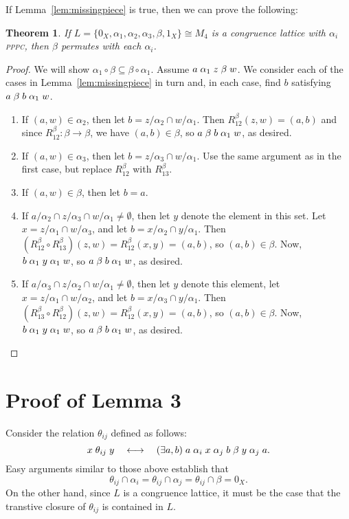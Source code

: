 \documentclass{amsart}
\theoremstyle{plain}
\newtheorem{theorem}{Theorem}
\theoremstyle{definition}
\theoremstyle{definition}
\numberwithin{equation}{section}
\newcommand{\<}{\ensuremath{\langle}}
\renewcommand{\>}{\ensuremath{\rangle}}
\newcommand{\rel}{\ensuremath{\mathrel}}
\newcommand{\PPPC}{\textsc{pppc}\xspace}
\begin{document}
If Lemma~\ref{lem:missingpiece} is true, then we can prove the following:
\begin{theorem}
If $L = \{0_X, \alpha_1, \alpha_2, \alpha_3, \beta, 1_X\} \cong  M_4$ is a
congruence lattice with $\alpha_i$ \PPPC, then $\beta$ permutes with each $\alpha_i$.
\end{theorem}
\begin{proof}
We will show $\alpha_1 \circ \beta \subseteq \beta \circ \alpha_1$.
Assume $a \rel{\alpha_1} z \rel{\beta} w$.  We consider each of the cases in
Lemma~\ref{lem:missingpiece} in turn and,
in each case, find $b$ satisfying $a \rel{\beta} b \rel{\alpha_1} w$.
\begin{enumerate}
\item If $(a,w) \in \alpha_2$, then let $b = z/\alpha_2 \cap w/\alpha_1$.  Then
$R^\beta_{12}(z,w) = (a,b)$ and since 
$R^\beta_{12}: \beta \rightarrow \beta$, we have $(a,b) \in \beta$, so 
$a \rel{\beta} b \rel{\alpha_1} w$, as desired.  
\item If $(a,w) \in \alpha_3$, then let $b = z/\alpha_3 \cap w/\alpha_1$. Use the same
argument as in the first case, but replace $R^\beta_{12}$ with $R^\beta_{13}$. 
\item If $(a,w) \in \beta$, then let $b = a$. 
\item If  $a/\alpha_2 \cap z/\alpha_3 \cap w/\alpha_1 \neq \emptyset$, then let
  $y$ denote the element in this set.  Let $x = z/\alpha_1 \cap w/\alpha_3$, and
  let $b = x/\alpha_2\cap y/\alpha_1$.  
  Then $(R^\beta_{12}\circ R^\beta_{13})(z,w) = R^\beta_{12}(x,y) = (a,b)$, so $(a,b) \in \beta$.
  Now, $b\rel{\alpha_1} y \rel{\alpha_1} w$, so
  $a \rel{\beta} b \rel{\alpha_1} w$, as desired.
\item If $a/\alpha_3 \cap z/\alpha_2 \cap w/\alpha_1 \neq \emptyset$, then let 
  $y$ denote this element, let $x = z/\alpha_1 \cap w/\alpha_2$, and
  let $b = x/\alpha_3\cap y/\alpha_1$.  
  Then $(R^\beta_{13}\circ R^\beta_{12})(z,w) = R^\beta_{12}(x,y) = (a,b)$, so $(a,b) \in \beta$.
  Now, $b\rel{\alpha_1} y \rel{\alpha_1} w$, so $a \rel{\beta} b \rel{\alpha_1} w$, as desired.
\end{enumerate}
\end{proof}

\section{Proof of Lemma 3}
Consider the relation $\theta_{ij}$ defined as follows:
\[
x \rel{\theta_{ij}} y \quad \longleftrightarrow \quad (\exists a, b) \;
a \rel{\alpha_i} x \rel{\alpha_j} b \rel{\beta} y \rel{\alpha_j} a.
\]
Easy arguments similar to those above establish that 
\[
\theta_{ij} \cap \alpha_i = \theta_{ij} \cap \alpha_j =
\theta_{ij} \cap \beta = 0_X.\]
On the other hand, since $L$ is a congruence lattice, it must be the case that
the transtive closure of $\theta_{ij}$ is contained in $L$.



\end{document}

